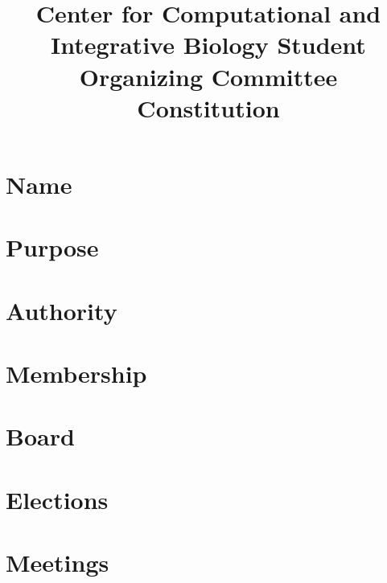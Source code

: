 \documentclass{article} %
\begin{document}
\title{Center for Computational and Integrative Biology Student Organizing Committee Constitution}
\date{}

\maketitle

\section{Name}



\section{Purpose}



\section{Authority}



\section{Membership}



\section{Board}



\section{Elections}



\section{Meetings}


\end{document}

